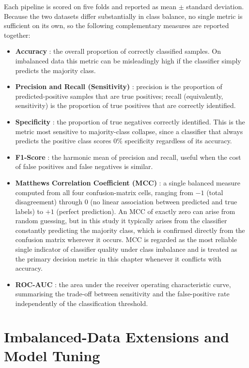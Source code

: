 Each pipeline is scored on five folds and reported as mean $\pm$ standard deviation. Because the two datasets differ substantially in class balance, no single metric is sufficient on its own, so the following complementary measures are reported together:

\begin{itemize}
    \item \textbf{Accuracy} : the overall proportion of correctly classified samples. On imbalanced data this metric can be misleadingly high if the classifier simply predicts the majority class.
    \item \textbf{Precision and Recall (Sensitivity)} : precision is the proportion of predicted-positive samples that are true positives; recall (equivalently, sensitivity) is the proportion of true positives that are correctly identified.
    \item \textbf{Specificity} : the proportion of true negatives correctly identified. This is the metric most sensitive to majority-class collapse, since a classifier that always predicts the positive class scores $0\%$ specificity regardless of its accuracy.
    \item \textbf{F1-Score} : the harmonic mean of precision and recall, useful when the cost of false positives and false negatives is similar.
    \item \textbf{Matthews Correlation Coefficient (MCC)} : a single balanced measure computed from all four confusion-matrix cells, ranging from $-1$ (total disagreement) through $0$ (no linear association between predicted and true labels) to $+1$ (perfect prediction). An MCC of exactly zero can arise from random guessing, but in this study it typically arises from the classifier constantly predicting the majority class, which is confirmed directly from the confusion matrix wherever it occurs. MCC is regarded as the most reliable single indicator of classifier quality under class imbalance and is treated as the primary decision metric in this chapter whenever it conflicts with accuracy.
    \item \textbf{ROC-AUC} : the area under the receiver operating characteristic curve, summarising the trade-off between sensitivity and the false-positive rate independently of the classification threshold.
\end{itemize}

\section{Imbalanced-Data Extensions and Model Tuning}
\label{sec:imbalance_extensions}

